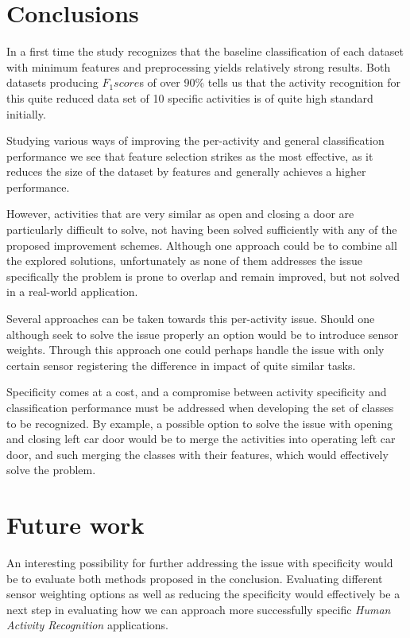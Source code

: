 \documentclass{sig-alternate}
\begin{document}
\section{Conclusions}
In a first time the study recognizes that the baseline classification of each dataset with minimum features and preprocessing yields relatively strong results. Both datasets producing $F_1 score$s of over 90\% tells us that the activity recognition for this quite reduced data set of 10 specific activities is of quite high standard initially.

Studying various ways of improving the per-activity and general classification performance we see that feature selection strikes as the most effective, as it reduces the size of the dataset by features and generally achieves a higher performance.

However, activities that are very similar as open and closing a door are particularly difficult to solve, not having been solved sufficiently with any of the proposed improvement schemes. Although one approach could be to combine all the explored solutions, unfortunately as none of them addresses the issue specifically the problem is prone to overlap and remain improved, but not solved in a real-world application. 

Several approaches can be taken towards this per-activity issue. Should one although seek to solve the issue properly an option would be to introduce sensor weights. Through this approach one could perhaps handle the issue with only certain sensor registering the difference in impact of quite similar tasks.

Specificity comes at a cost, and a compromise between activity specificity and classification performance must be addressed when developing the set of classes to be recognized. By example, a possible option to solve the issue with opening and closing left car door would be to merge the activities into operating left car door, and such merging the classes with their features, which would effectively solve the problem.


\section{Future work}
An interesting possibility for further addressing the issue with specificity would be to evaluate both methods proposed in the conclusion. Evaluating different sensor weighting options as well as reducing the specificity would effectively be a next step in evaluating how we can approach more successfully specific \textit{Human Activity Recognition} applications.
\end{document}
